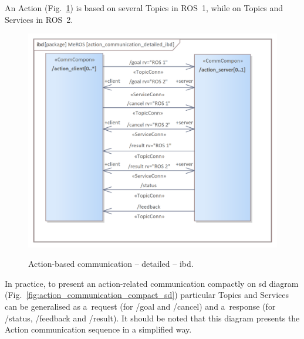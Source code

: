 \documentclass[11pt,oneside,a4paper]{article}
\begin{document}
	\pagebreak
	
	
	 An Action (Fig.~\ref{fig:action_communication_detailed_ibd}) is based on several Topics in ROS~1, while on Topics and Services in ROS~2.
	

	\begin{figure}[H]
		\centering
		\begin{center}
			{\includegraphics[scale=1.0]{img/meros_pkg/action_communication_detailed_ibd.png}}
		\end{center}
		\caption{Action-based communication -- detailed -- ibd.} 
		\label{fig:action_communication_detailed_ibd}
	\end{figure}
	
	In practice, to present an action-related communication compactly on sd diagram (Fig.~\ref{fig:action_communication_compact_sd}) particular Topics and Services can be generalised as a~request (for /goal and /cancel) and a~response (for /status, /feedback and /result). It should be noted that this diagram presents the Action communication sequence in a simplified way.
	
\end{document}

